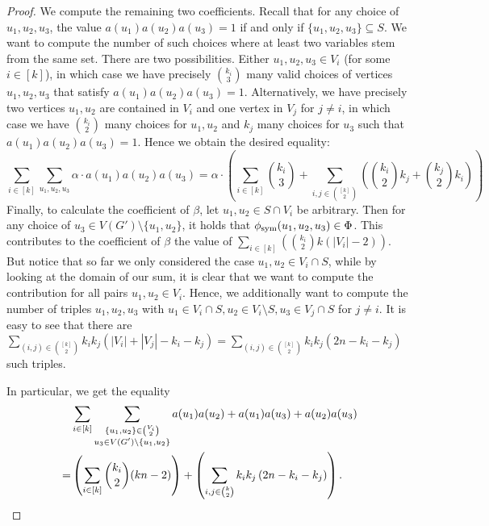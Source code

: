 \documentclass[a4paper,UKenglish,cleveref, autoref, thm-restate,numberwithinsect]{lipics-v2021}
\newcommand{\phisym}{\phi_{\rm sym}}
\begin{document}
\begin{proof}
        We compute the remaining two coefficients.
        Recall that for any choice of $u_1,u_2,u_3$, the value $a(u_1)a(u_2)a(u_3) = 1$ if and only if $\{u_1,u_2,u_3\}\subseteq S$. 
        We want to compute the number of such choices where at least two variables stem from the same set.
        There are two possibilities. Either $u_1,u_2,u_3\in V_i$ (for some $i\in[k]$), in which case we have precisely $\binom{k_i}{3}$ many valid choices of vertices $u_1,u_2,u_3$ that satisfy $a(u_1)a(u_2)a(u_3) = 1$.
        Alternatively, we have precisely two vertices $u_1,u_2$ are contained in $V_i$ and one vertex in $V_j$ for $j\neq i$, in which case we have $\binom{k_i}{2}$ many choices for $u_1,u_2$ and $k_j$ many choices for $u_3$ such that $a(u_1)a(u_2)a(u_3) = 1$.
        Hence we obtain the desired equality:
        \[
        \sum_{i\in[k]}\sum_{u_1, u_2, u_3} \alpha \cdot a(u_1)a(u_2)a(u_3) = \alpha\cdot \left(\sum_{i\in [k]}\binom{k_i}{3} + \sum_{i,j\in\binom{[k]}{2}}\left(\binom{k_i}{2}k_j + \binom{k_j}{2}k_i\right)\right) 
        \]
        Finally, to calculate the coefficient of $\beta$, let $u_1,u_2\in S\cap V_i$ be arbitrary. 
        Then for any choice of $u_3\in V(G')\setminus\{u_1,u_2\}$, it holds that $\phisym(u_1,u_2,u_3)\in \Phi$. This contributes to the coefficient of $\beta$ the value of $\sum_{i\in [k]} \left(\binom{k_i}{2}k(|V_i|-2)\right)$.
        But notice that so far we only considered the case $u_1,u_2\in V_i\cap S$, while by looking at the domain of our sum, it is clear that we want to compute the contribution for all pairs $u_1,u_2\in V_i$.
        Hence, we additionally want to compute the number of triples $u_1,u_2,u_3$ with $u_1\in V_i\cap S, u_2\in V_i\setminus S, u_3\in V_j\cap S$ for $j\neq i$.
        It is easy to see that there are $\sum_{(i,j)\in \binom{[k]}{2}}k_ik_j(|V_i| + |V_j|-k_i - k_j) = \sum_{(i,j)\in \binom{[k]}{2}}k_ik_j(2n -k_i - k_j)$ such triples.


        In particular, we get the equality
        \begin{align*}
            &\sum_{i\in[k]}\sum_{\substack{\{u_1,u_2\}\in \binom{V_i}{2}\\u_3\in V(G')\setminus\{u_1,u_2\} }}a(u_1)a(u_2)+a(u_1)a(u_3)+a(u_2)a(u_3)\\
            = &\left(\sum_{i\in [k]} \binom{k_i}{2}(kn-2)\right) + \left(\sum_{i,j\in\binom{k}{2}}k_ik_j\left(2n-k_i-k_j\right)\right). \qedhere
        \end{align*}
        
    
    \end{proof}
\end{document}
